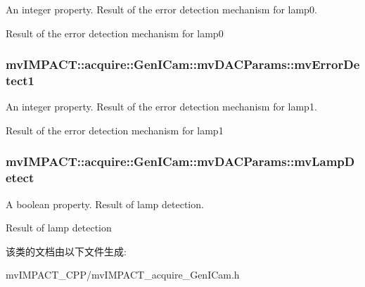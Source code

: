 An integer property. Result of the error detection mechanism for lamp0. 

Result of the error detection mechanism for lamp0 \hypertarget{classmv_i_m_p_a_c_t_1_1acquire_1_1_gen_i_cam_1_1mv_d_a_c_params_aa620f0c6c8cae2c33de728a8b6d26b88}{
\subsubsection[{mv\+Error\+Detect1}]{ mv\+I\+M\+P\+A\+C\+T\+::acquire\+::\+Gen\+I\+Cam\+::mv\+D\+A\+C\+Params\+::mv\+Error\+Detect1}}\label{classmv_i_m_p_a_c_t_1_1acquire_1_1_gen_i_cam_1_1mv_d_a_c_params_aa620f0c6c8cae2c33de728a8b6d26b88}


An integer property. Result of the error detection mechanism for lamp1. 

Result of the error detection mechanism for lamp1 \hypertarget{classmv_i_m_p_a_c_t_1_1acquire_1_1_gen_i_cam_1_1mv_d_a_c_params_acf412cf6c8286c85546f8494c7e83362}{
\subsubsection[{mv\+Lamp\+Detect}]{ mv\+I\+M\+P\+A\+C\+T\+::acquire\+::\+Gen\+I\+Cam\+::mv\+D\+A\+C\+Params\+::mv\+Lamp\+Detect}}\label{classmv_i_m_p_a_c_t_1_1acquire_1_1_gen_i_cam_1_1mv_d_a_c_params_acf412cf6c8286c85546f8494c7e83362}


A boolean property. Result of lamp detection. 

Result of lamp detection 

该类的文档由以下文件生成\+:\begin{DoxyCompactItemize}
\item 
mv\+I\+M\+P\+A\+C\+T\+\_\+\+C\+P\+P/mv\+I\+M\+P\+A\+C\+T\+\_\+acquire\+\_\+\+Gen\+I\+Cam.\+h\end{DoxyCompactItemize}

